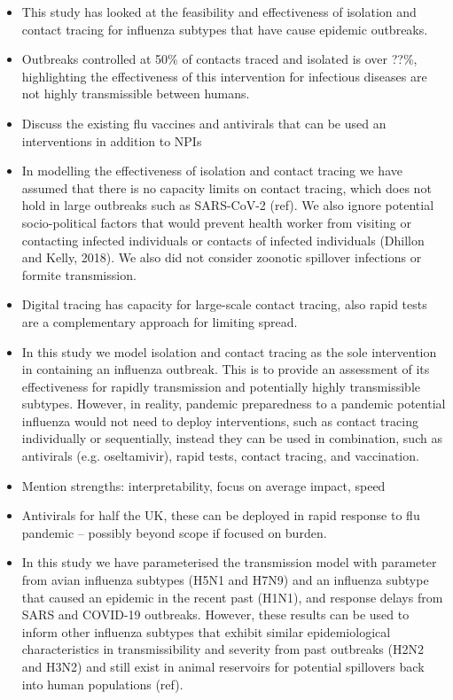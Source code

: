 \documentclass{article}
\begin{document}
\begin{itemize}
\item This study has looked at the feasibility and effectiveness of isolation and contact tracing for influenza subtypes that have cause epidemic outbreaks.
\item Outbreaks controlled at 50\% of contacts traced and isolated is over ??\%, highlighting the effectiveness of this intervention for infectious diseases are not highly transmissible between humans.
\item Discuss the existing flu vaccines and antivirals that can be used an interventions in addition to NPIs
\item In modelling the effectiveness of isolation and contact tracing we have assumed that there is no capacity limits on contact tracing, which does not hold in large outbreaks such as SARS-CoV-2 (ref). We also ignore potential socio-political factors that would prevent health worker from visiting or contacting infected individuals or contacts of infected individuals (Dhillon and Kelly, 2018). We also did not consider zoonotic spillover infections or formite transmission.
\item Digital tracing has capacity for large-scale contact tracing, also rapid tests are a complementary approach for limiting spread.
\item In this study we model isolation and contact tracing as the sole intervention in containing an influenza outbreak. This is to provide an assessment of its effectiveness for rapidly transmission and potentially highly transmissible subtypes. However, in reality, pandemic preparedness to a pandemic potential influenza would not need to deploy interventions, such as contact tracing individually or sequentially, instead they can be used in combination, such as antivirals (e.g. oseltamivir), rapid tests, contact tracing, and vaccination.
\item Mention strengths: interpretability, focus on average impact, speed
\item Antivirals for half the UK, these can be deployed in rapid response to flu pandemic -- possibly beyond scope if focused on burden.
\item In this study we have parameterised the transmission model with parameter from avian influenza subtypes (H5N1 and H7N9) and an influenza subtype that caused an epidemic in the recent past (H1N1), and response delays from SARS and COVID-19 outbreaks. However, these results can be used to inform other influenza subtypes that exhibit similar epidemiological characteristics in transmissibility and severity from past outbreaks (H2N2 and H3N2) and still exist in animal reservoirs for potential spillovers back into human populations (ref).

\end{itemize}
\end{document}
